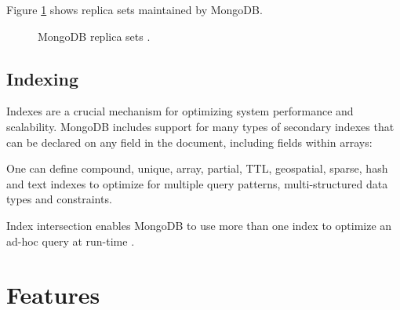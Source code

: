 \documentclass[9pt,twocolumn,twoside]{../../styles/osajnl}
\begin{document}
Figure \ref{fig:figure2} shows replica sets maintained by MongoDB.

\begin{figure}[htbp]
\centering
{}
\caption{MongoDB replica sets \cite{www-mongo4}.} 
\label{fig:figure2}
\end{figure}

\subsection {Indexing}

Indexes are a crucial mechanism for optimizing system performance and scalability. MongoDB includes support for many types of secondary indexes that can be declared on any field in the document, including fields within arrays:

One can define compound, unique, array, partial, TTL, geospatial, sparse, hash and text indexes to optimize for multiple query patterns, multi-structured data types and constraints.

Index intersection enables MongoDB to use more than one index to optimize an ad-hoc query at run-time \cite{www-mongo5}.
    
\section{Features}
\end{document}
